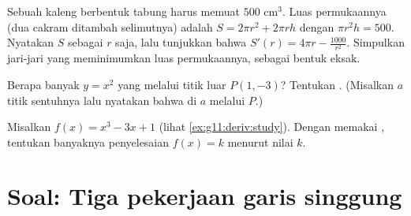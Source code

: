 \begin{exercise}[$\star\star$]\label{exo:g11:deriv:10}
Sebuah kaleng berbentuk tabung harus memuat $500$ cm$^3$. Luas permukaannya
(dua cakram ditambah selimutnya) adalah $S = 2\pi r^2 + 2\pi r h$ dengan
$\pi r^2 h = 500$. Nyatakan $S$ sebagai  $r$ saja, lalu tunjukkan bahwa
$S'(r) = 4\pi r - \frac{1000}{r^2}$. Simpulkan jari-jari yang meminimumkan
luas permukaannya, sebagai bentuk eksak.
\end{exercise}

\begin{exercise}[$\star\star\star$]\label{exo:g11:deriv:11}
Berapa banyak   $y = x^2$ yang melalui titik luar
$P(1, -3)$? Tentukan . (Misalkan $a$  titik
sentuhnya lalu nyatakan bahwa  di $a$ melalui $P$.)
\end{exercise}

\begin{exercise}[$\star\star\star$]\label{exo:g11:deriv:12}
Misalkan $f(x) = x^3 - 3x + 1$ (lihat \cref{ex:g11:deriv:study}). Dengan
memakai , tentukan banyaknya penyelesaian 
$f(x) = k$ menurut nilai  $k$.
\end{exercise}

\section{Soal: Tiga pekerjaan garis singgung}

